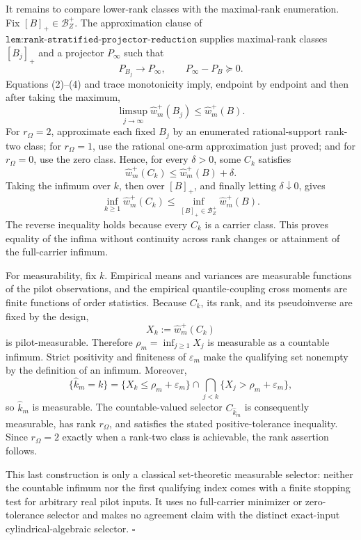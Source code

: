 It remains to compare lower-rank classes with the maximal-rank enumeration.  Fix \([B]_+\in\mathcal B_Z^+\).  The approximation clause of \(\texttt{lem:rank-stratified-projector-reduction}\) supplies maximal-rank classes \([B_j]_+\) and a projector \(P_\infty\) such that
\[
P_{B_j}\longrightarrow P_\infty,
\qquad P_\infty-P_B\succeq0.
\tag{4}
\]
Equations (2)--(4) and trace monotonicity imply, endpoint by endpoint and then after taking the maximum,
\[
\limsup_{j\to\infty}\widehat w_m^+(B_j)
\le \widehat w_m^+(B).
\tag{5}
\]
For \(r_\Omega=2\), approximate each fixed \(B_j\) by an enumerated rational-support rank-two class; for \(r_\Omega=1\), use the rational one-arm approximation just proved; and for \(r_\Omega=0\), use the zero class.  Hence, for every \(\delta>0\), some \(C_k\) satisfies
\[
\widehat w_m^+(C_k)\le\widehat w_m^+(B)+\delta.
\tag{6}
\]
Taking the infimum over \(k\), then over \([B]_+\), and finally letting \(\delta\downarrow0\), gives
\[
\inf_{k\ge1}\widehat w_m^+(C_k)
\le\inf_{[B]_+\in\mathcal B_Z^+}\widehat w_m^+(B).
\tag{7}
\]
The reverse inequality holds because every \(C_k\) is a carrier class.  This proves equality of the infima without continuity across rank changes or attainment of the full-carrier infimum.

For measurability, fix \(k\).  Empirical means and variances are measurable functions of the pilot observations, and the empirical quantile-coupling cross moments are finite functions of order statistics.  Because \(C_k\), its rank, and its pseudoinverse are fixed by the design,
\[
X_k:=\widehat w_m^+(C_k)
\]
is pilot-measurable.  Therefore \(\rho_m=\inf_{j\ge1}X_j\) is measurable as a countable infimum.  Strict positivity and finiteness of \(\varepsilon_m\) make the qualifying set nonempty by the definition of an infimum.  Moreover,
\[
\{\widehat k_m=k\}
=\{X_k\le\rho_m+\varepsilon_m\}
\cap\bigcap_{j<k}\{X_j>\rho_m+\varepsilon_m\},
\tag{8}
\]
so \(\widehat k_m\) is measurable.  The countable-valued selector \(C_{\widehat k_m}\) is consequently measurable, has rank \(r_\Omega\), and satisfies the stated positive-tolerance inequality.  Since \(r_\Omega=2\) exactly when a rank-two class is achievable, the rank assertion follows.

This last construction is only a classical set-theoretic measurable selector: neither the countable infimum nor the first qualifying index comes with a finite stopping test for arbitrary real pilot inputs.  It uses no full-carrier minimizer or zero-tolerance selector and makes no agreement claim with the distinct exact-input cylindrical-algebraic selector. \(\square\)
